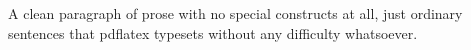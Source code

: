 \documentclass{article}
\begin{document}
A clean paragraph of prose with no special constructs at all, just ordinary
sentences that pdflatex typesets without any difficulty whatsoever.
\end{document}
